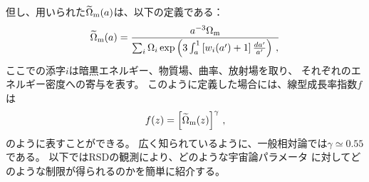 但し、用いられた$ \widetilde{\Omega}_{\rm m}(a)$は、以下の定義である：
\begin{eqnarray}
  \label{eq:OmegaEff}
  \widetilde{\Omega}_{\rm m}(a) = \frac{a^{-3}\Omega_{\rm m}}
{\sum_i\Omega_i 
\exp \left(
  3 \int_a^1 \left[
  w_i (a') + 1
              \right]
              \frac{d a'}{a'}
      \right)
   \,,
}
\end{eqnarray}
ここでの添字$i$は暗黒エネルギー、物質場、曲率、放射場を取り、
それぞれのエネルギー密度への寄与を表す。
このように定義した場合には、線型成長率指数$f$は
\begin{eqnarray}
  \label{eq:fapprox}
  f(z) = \left[
        \widetilde{\Omega}_{\rm m}(z)
         \right]^{\gamma}
  \,,
\end{eqnarray}
のように表すことができる。
広く知られているように、一般相対論では$\gamma\simeq 0.55$である。
以下ではRSDの観測により、どのような宇宙論パラメータ
に対してどのような制限が得られるのかを簡単に紹介する。
 
